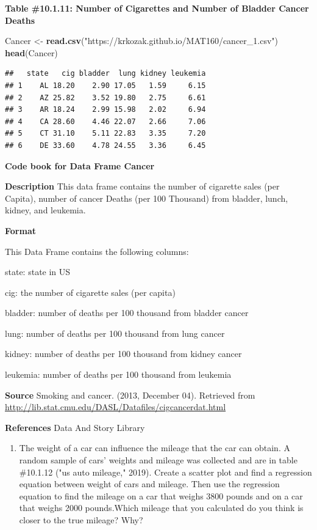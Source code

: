 \documentclass[]{book}
\newenvironment{Shaded}{\begin{snugshade}}{\end{snugshade}}
\newcommand{\KeywordTok}[1]{\textcolor[rgb]{0.13,0.29,0.53}{\textbf{#1}}}
\newcommand{\NormalTok}[1]{#1}
\newcommand{\StringTok}[1]{\textcolor[rgb]{0.31,0.60,0.02}{#1}}
\providecommand{\tightlist}{%
  \setlength{\itemsep}{0pt}\setlength{\parskip}{0pt}}
\begin{document}
\textbf{Table \#10.1.11: Number of Cigarettes and Number of Bladder Cancer Deaths}

\begin{Shaded}
\begin{Highlighting}[]
\NormalTok{Cancer <-}\StringTok{ }\KeywordTok{read.csv}\NormalTok{(}\StringTok{"https://krkozak.github.io/MAT160/cancer_1.csv"}\NormalTok{)}
\KeywordTok{head}\NormalTok{(Cancer)}
\end{Highlighting}
\end{Shaded}

\begin{verbatim}
##   state   cig bladder  lung kidney leukemia
## 1    AL 18.20    2.90 17.05   1.59     6.15
## 2    AZ 25.82    3.52 19.80   2.75     6.61
## 3    AR 18.24    2.99 15.98   2.02     6.94
## 4    CA 28.60    4.46 22.07   2.66     7.06
## 5    CT 31.10    5.11 22.83   3.35     7.20
## 6    DE 33.60    4.78 24.55   3.36     6.45
\end{verbatim}

\textbf{Code book for Data Frame Cancer}

\textbf{Description}
This data frame contains the number of cigarette sales (per Capita), number of cancer Deaths (per 100 Thousand) from bladder, lunch, kidney, and leukemia.

\textbf{Format}

This Data Frame contains the following columns:

state: state in US

cig: the number of cigarette sales (per capita)

bladder: number of deaths per 100 thousand from bladder cancer

lung: number of deaths per 100 thousand from lung cancer

kidney: number of deaths per 100 thousand from kidney cancer

leukemia: number of deaths per 100 thousand from leukemia

\textbf{Source}
Smoking and cancer. (2013, December 04). Retrieved from
\url{http://lib.stat.cmu.edu/DASL/Datafiles/cigcancerdat.html}

\textbf{References}
Data And Story Library

\begin{enumerate}
\def\labelenumi{\arabic{enumi}.}
\setcounter{enumi}{9}
\tightlist
\item
  The weight of a car can influence the mileage that the car can obtain. A random sample of cars' weights and mileage was collected and are in table \#10.1.12 ("us auto mileage," 2019). Create a scatter plot and find a regression equation between weight of cars and mileage. Then use the regression equation to find the mileage on a car that weighs 3800 pounds and on a car that weighs 2000 pounds.Which mileage that you calculated do you think is closer to the true mileage? Why?
\end{enumerate}
\end{document}
